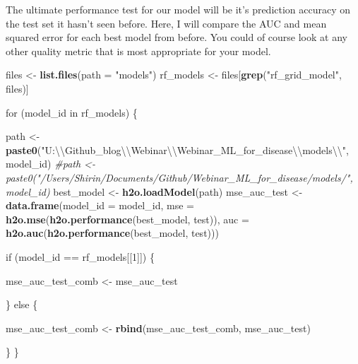 \documentclass[]{article}
\newenvironment{Shaded}{\begin{snugshade}}{\end{snugshade}}
\newcommand{\KeywordTok}[1]{\textcolor[rgb]{0.13,0.29,0.53}{\textbf{{#1}}}}
\newcommand{\DataTypeTok}[1]{\textcolor[rgb]{0.13,0.29,0.53}{{#1}}}
\newcommand{\DecValTok}[1]{\textcolor[rgb]{0.00,0.00,0.81}{{#1}}}
\newcommand{\CharTok}[1]{\textcolor[rgb]{0.31,0.60,0.02}{{#1}}}
\newcommand{\StringTok}[1]{\textcolor[rgb]{0.31,0.60,0.02}{{#1}}}
\newcommand{\CommentTok}[1]{\textcolor[rgb]{0.56,0.35,0.01}{\textit{{#1}}}}
\newcommand{\NormalTok}[1]{{#1}}
\begin{document}
The ultimate performance test for our model will be it's prediction
accuracy on the test set it hasn't seen before. Here, I will compare the
AUC and mean squared error for each best model from before. You could of
course look at any other quality metric that is most appropriate for
your model.

\begin{Shaded}
\begin{Highlighting}[]
\NormalTok{files <-}\StringTok{ }\KeywordTok{list.files}\NormalTok{(}\DataTypeTok{path =} \StringTok{"models"}\NormalTok{)}
\NormalTok{rf_models <-}\StringTok{ }\NormalTok{files[}\KeywordTok{grep}\NormalTok{(}\StringTok{"rf_grid_model"}\NormalTok{, files)]}

\NormalTok{for (model_id in rf_models) \{}
  
  \NormalTok{path <-}\StringTok{ }\KeywordTok{paste0}\NormalTok{(}\StringTok{"U:}\CharTok{\textbackslash{}\textbackslash{}}\StringTok{Github_blog}\CharTok{\textbackslash{}\textbackslash{}}\StringTok{Webinar}\CharTok{\textbackslash{}\textbackslash{}}\StringTok{Webinar_ML_for_disease}\CharTok{\textbackslash{}\textbackslash{}}\StringTok{models}\CharTok{\textbackslash{}\textbackslash{}}\StringTok{"}\NormalTok{, model_id)}
  \CommentTok{#path <- paste0("/Users/Shirin/Documents/Github/Webinar_ML_for_disease/models/", model_id)}
  \NormalTok{best_model <-}\StringTok{ }\KeywordTok{h2o.loadModel}\NormalTok{(path)}
  \NormalTok{mse_auc_test <-}\StringTok{ }\KeywordTok{data.frame}\NormalTok{(}\DataTypeTok{model_id =} \NormalTok{model_id, }
                             \DataTypeTok{mse =} \KeywordTok{h2o.mse}\NormalTok{(}\KeywordTok{h2o.performance}\NormalTok{(best_model, test)),}
                             \DataTypeTok{auc =} \KeywordTok{h2o.auc}\NormalTok{(}\KeywordTok{h2o.performance}\NormalTok{(best_model, test)))}
  
  \NormalTok{if (model_id ==}\StringTok{ }\NormalTok{rf_models[[}\DecValTok{1}\NormalTok{]]) \{}
    
    \NormalTok{mse_auc_test_comb <-}\StringTok{ }\NormalTok{mse_auc_test}
    
  \NormalTok{\} else \{}
    
    \NormalTok{mse_auc_test_comb <-}\StringTok{ }\KeywordTok{rbind}\NormalTok{(mse_auc_test_comb, mse_auc_test)}
    
  \NormalTok{\}}
\NormalTok{\}}


\end{Highlighting}
\end{Shaded}
\end{document}
